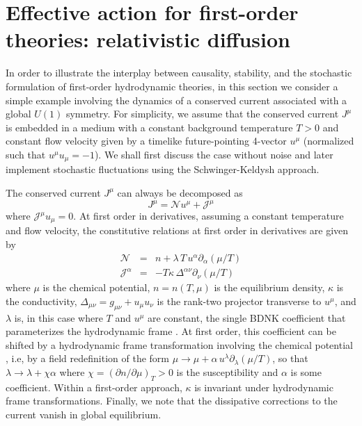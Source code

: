 \documentclass[aps,prd,nofootinbib,amsmath,amssymb,showpacs,longbibliography,singlecolumn,superscriptaddress,notitlepage]{revtex4-1}
\theoremstyle{plain}
\theoremstyle{definition}
\newcommand{\be}{\begin{equation}}
\newcommand{\ee}{\end{equation}}
\newcommand{\bea}{\begin{eqnarray}}
\newcommand{\eea}{\end{eqnarray}}
\begin{document}
\section{Effective action for first-order theories: relativistic diffusion}
\label{U1_gaugetheory}

In order to illustrate the interplay between causality, stability, and the stochastic formulation of first-order hydrodynamic theories, in this section we consider a simple example involving the dynamics of a conserved current associated with a global $U(1)$ symmetry. For simplicity, we assume that the conserved current $J^\mu$ is embedded in a medium with a constant background temperature $T>0$ and constant flow velocity given by a timelike future-pointing 4-vector $u^\mu$ (normalized such that $u^\mu u_\mu = -1$). We shall first discuss the case without noise and later implement stochastic fluctuations using the Schwinger-Keldysh approach. 

The conserved current $J^\mu$ can always be decomposed as
\be
J^\mu = \mathcal{N}u^\mu + \mathcal{J}^\mu
\label{define_J}
\ee
where $\mathcal{J}^\mu u_\mu=0$. At first order in derivatives, assuming a constant temperature and flow velocity, the constitutive relations at first order in derivatives are given by 
\bea
\mathcal{N} &=& n + \lambda\, T\, u^\alpha \partial_\alpha \left(\mu/T\right)\\ \nonumber
\mathcal{J}^\alpha &=&  - T \kappa\, \Delta^{\alpha\nu}\partial_\nu\left(\mu/T\right)  
\label{defineNandJ}
\eea
where $\mu$ is the chemical potential, $n = n(T,\mu)$ is the equilibrium density, $\kappa$ is the conductivity, $\Delta_{\mu\nu} = g_{\mu\nu}+u_\mu u_\nu$ is the rank-two projector transverse to $u^\mu$, and $\lambda$ is, in this case where $T$ and $u^\mu$ are constant, the single BDNK coefficient that parameterizes the hydrodynamic frame \cite{Kovtun:2019hdm}. At first order, this coefficient can be shifted by a hydrodynamic frame transformation involving the chemical potential \cite{Kovtun:2019hdm}, i.e, by a field redefinition of the form $ \mu \rightarrow  \mu + \alpha\, u^\lambda \partial_\lambda (\mu/T)$, so that   $\lambda \to \lambda + \chi \alpha$ where $\chi = (\partial n/\partial\mu)_T>0$ is the susceptibility and $\alpha$ is some coefficient. Within a first-order approach,  $\kappa$ is invariant under hydrodynamic frame transformations. 
Finally, we note that the dissipative corrections to the current vanish in global equilibrium.
\end{document}
